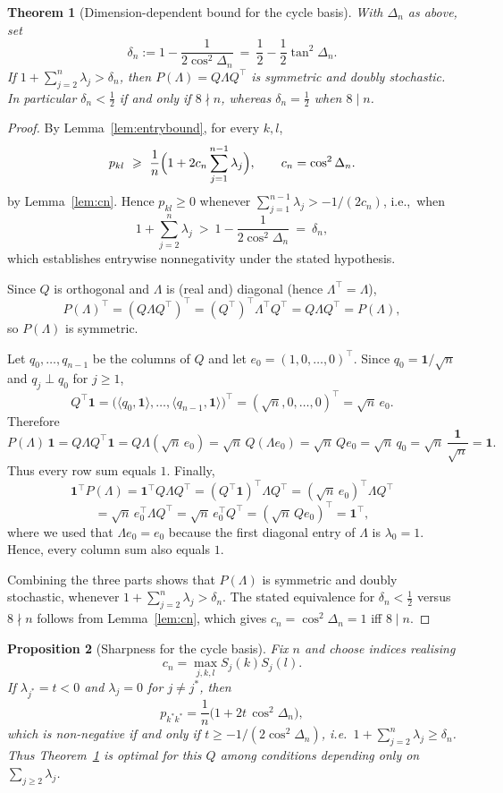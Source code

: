 \documentclass[12pt,fleqn]{amsart}
\renewcommand{\ge}{\geqslant}
\newtheorem{thm}{Theorem}
\newtheorem{prop}[thm]{Proposition}
\theoremstyle{remark}
\newcommand{\1}{\mathbf{1}}
\newcommand{\Lam}{\Lambda}
\begin{document}
\begin{thm}[Dimension-dependent bound for the cycle basis]\label{thm:cycle}
With $\Delta_n$ as above, set
\[
\delta_n:=1-\frac{1}{2\cos^2\Delta_n}
\ =\ \frac12-\frac12\tan^2\Delta_n.
\]
If $1+\sum_{j=2}^n\lambda_j>\delta_n$, then $P(\Lam)=Q\Lam Q^\top$ is symmetric and doubly stochastic. In particular $\delta_n<\tfrac12$ if and only if $8\nmid n$, whereas $\delta_n=\tfrac12$ when $8\mid n$.
\end{thm}

\begin{proof}
By Lemma~\ref{lem:entrybound}, for every $k,l$,
\[
p_{kl}\ \ge\ \frac1n\Bigl(1+2c_n\sum_{j=1}^{n-1}\lambda_j\Bigr),
\qquad c_n=\cos^2\Delta_n.
\]
by Lemma~\ref{lem:cn}. Hence $p_{kl}\ge0$ whenever $\sum_{j=1}^{n-1}\lambda_j>-1/(2c_n)$, i.e.,\ when
\[
1+\sum_{j=2}^n\lambda_j\ >\ 1-\frac{1}{2\cos^2\Delta_n}\ =\ \delta_n,
\]
which establishes entrywise nonnegativity under the stated hypothesis.

\smallskip
Since $Q$ is orthogonal and $\Lambda$ is (real and) diagonal (hence $\Lambda^\top=\Lambda$),
\[
P(\Lambda)^\top=(Q\Lambda Q^\top)^\top=(Q^\top)^\top\Lambda^\top Q^\top=Q\Lambda Q^\top=P(\Lambda),
\]
so $P(\Lambda)$ is symmetric.

\smallskip
Let $q_0,\dots,q_{n-1}$ be the columns of $Q$ and let $e_0=(1,0,\dots,0)^\top$. Since $q_0=\1/\sqrt n$ and $q_j\perp q_0$ for $j\ge1$,
\[
Q^\top\1=\big(\langle q_0,\1\rangle,\dots,\langle q_{n-1},\1\rangle\big)^\top=(\sqrt n,0,\dots,0)^\top=\sqrt n\,e_0.
\]
Therefore
\[
P(\Lambda)\,\1
=Q\Lambda Q^\top\1
=Q\Lambda(\sqrt n\,e_0)
=\sqrt n\,Q(\Lambda e_0)
=\sqrt n\,Q e_0
=\sqrt n\,q_0
=\sqrt n\,\frac{\1}{\sqrt n}
=\1.
\]
Thus every row sum equals $1$. Finally,
\[
\1^\top P(\Lambda)
=\1^\top Q\Lambda Q^\top
=(Q^\top\1)^\top \Lambda Q^\top
=(\sqrt n\,e_0)^\top \Lambda Q^\top
\]
\[
=\sqrt n\,e_0^\top \Lambda Q^\top
=\sqrt n\,e_0^\top Q^\top
=(\sqrt n\,Q e_0)^\top
=\1^\top,
\]
where we used that $\Lambda e_0=e_0$ because the first diagonal entry of $\Lambda$ is $\lambda_0=1$. Hence, every column sum also equals $1$.

Combining the three parts shows that $P(\Lambda)$ is symmetric and doubly stochastic, whenever $1+\sum_{j=2}^n\lambda_j>\delta_n$. The stated equivalence for $\delta_n<\tfrac12$ versus $8\nmid n$ follows from Lemma~\ref{lem:cn}, which gives $c_n=\cos^2\Delta_n=1$ iff $8\mid n$.
\end{proof}


\begin{prop}[Sharpness for the cycle basis]\label{prop:sharp}
Fix $n$ and choose indices realising 
\[
    c_n=\max_{j,k,l}S_j(k)S_j(l).
\]
If $\lambda_{j^{\ast}}=t<0$ and $\lambda_j=0$ for $j\ne j^{\ast}$, then
\[
p_{k^{\ast}k^{\ast}}=\frac1n\bigl(1+2t\,\cos^2\Delta_n\bigr),
\]
which is non-negative if and only if $t\ge -1/(2\cos^2\Delta_n)$, i.e.\ $1+\sum_{j=2}^n\lambda_j\ge\delta_n$. Thus Theorem~\ref{thm:cycle} is optimal for this $Q$ among conditions depending only on $\sum_{j\ge 2}\lambda_j$.
\end{prop}
\end{document}
